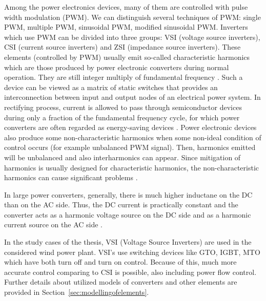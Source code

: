 \documentclass[12pt]{report} %
\begin{document}
Among the power electronics devices, many of them are controlled with pulse width modulation (PWM). We can distinguish several techniques of PWM: single PWM, multiple PWM, sinusoidal PWM, modified sinusoidal PWM. Inverters which use PWM can be divided into three groups: VSI (voltage source inverters), CSI (current source inverters) and ZSI (impedance source inverters). 
These elements (controlled by PWM) usually emit so-called characteristic harmonics which are those produced by power electronic converters during normal operation. They are still integer multiply of fundamental frequency \cite{das}. Such a device can be viewed as a matrix of static switches that provides an interconnection between input and output nodes of an electrical power system. In rectifying process, current is allowed to pass through semiconductor devices during only a fraction of the fundamental frequency cycle, for which power converters are often regarded as energy-saving devices \cite{rosa}.
Power electronic devices also produce some non-characteristic harmonics when some non-ideal condition of control occurs (for example unbalanced PWM signal). Then, harmonics emitted will be unbalanced and also interharmonics can appear. Since mitigation of harmonics is usually designed for characteristic harmonics, the non-characteristic harmonics can cause significant problems \cite{das}.

In large power converters, generally, there is much higher inductane on the DC than on the AC side. Thus, the DC current is practically constant and the converter acts as a harmonic voltage source on the DC side and as a harmonic current source on the AC side \cite{rosa}.

In the study cases of the thesis, VSI (Voltage Source Inverters) are used in the considered wind power plant. VSI’s use switching devices like GTO, IGBT, MTO which have both turn off and turn on control. Because of this, much more accurate control comparing to CSI is possible, also including power flow control. Further details about utilized models of converters and other elements are provided in Section~\ref{sec:modellingofelements}.

\end{document}
